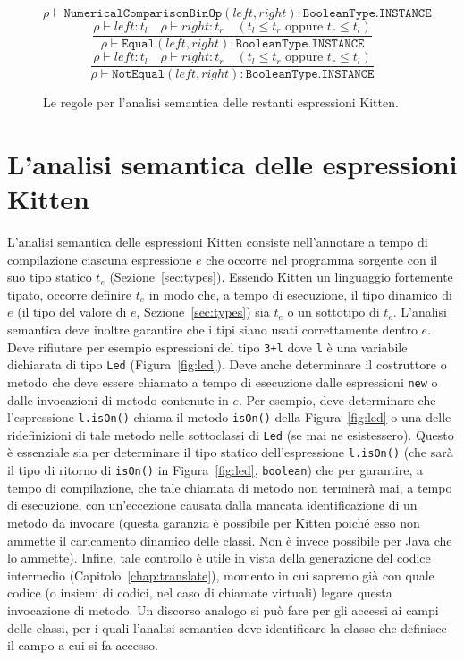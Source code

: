 \begin{figure}[t]
{\[         {\rho\vdash\mathtt{NumericalComparisonBinOp
           (\mathit{left},\mathit{right})}:\mathtt{BooleanType.INSTANCE}}
  \]
  \[
    \frac{\rho\vdash\mathit{left}:t_l\quad
          \rho\vdash\mathit{right}:t_r\quad (t_l\le t_r\text{ oppure }
          t_r\le t_l)}
         {\rho\vdash\mathtt{Equal(\mathit{left},\mathit{right})}:
           \mathtt{BooleanType.INSTANCE}}
  \]
  \[
    \frac{\rho\vdash\mathit{left}:t_l\quad
          \rho\vdash\mathit{right}:t_r\quad (t_l\le t_r\text{ oppure }
          t_r\le t_l)}
         {\rho\vdash\mathtt{NotEqual(\mathit{left},\mathit{right})}:
           \mathtt{BooleanType.INSTANCE}}
  \]
}
\caption{Le regole per l'analisi semantica delle restanti espressioni Kitten.}
  \label{fig:analysis_expressions2}
\end{figure}
%
\section{L'analisi semantica delle espressioni Kitten}
  \label{sec:analysis_expressions}
%
L'analisi semantica delle espressioni Kitten consiste nell'annotare a tempo
di compilazione ciascuna
espressione $e$ che occorre nel programma sorgente con il suo tipo statico
$t_e$ (Sezione~\ref{sec:types}).
Essendo Kitten un linguaggio fortemente tipato, occorre definire
$t_e$ in modo che, a tempo di esecuzione, il tipo dinamico di $e$
(\cioe il tipo del valore di $e$, Sezione~\ref{sec:types})
sia $t_e$ o un sottotipo di $t_e$.
L'analisi semantica deve inoltre garantire che i tipi siano usati correttamente
dentro $e$. Deve rifiutare per esempio espressioni del tipo
\texttt{3+l} dove \texttt{l} \`e una variabile dichiarata di tipo
\texttt{Led} (Figura~\ref{fig:led}). Deve anche determinare il costruttore o 
metodo che deve essere chiamato a tempo di esecuzione dalle espressioni
\texttt{new} o dalle invocazioni di metodo contenute in $e$. Per esempio,
deve determinare che l'espressione \texttt{l.isOn()} chiama il metodo
\texttt{isOn()} della Figura~\ref{fig:led} o una delle ridefinizioni di tale
metodo nelle sottoclassi di \texttt{Led} (se mai ne esistessero). Questo \`e
essenziale sia per determinare il tipo statico dell'espressione
\texttt{l.isOn()} (che sar\`a il tipo di ritorno di \texttt{isOn()} in
Figura~\ref{fig:led}, \cioe \texttt{boolean})
che per garantire, a tempo di compilazione, che tale chiamata di metodo
non terminer\`a mai, a tempo di esecuzione, con un'eccezione causata dalla
mancata identificazione di un metodo da invocare (questa garanzia \`e possibile
per Kitten poich\'e esso non ammette il caricamento dinamico delle classi.
Non \`e invece possibile per Java che lo ammette). Infine, tale
controllo \`e utile in vista della generazione del codice intermedio
(Capitolo~\ref{chap:translate}), momento in cui sapremo gi\`a con quale
codice (o insiemi di codici, nel caso di chiamate virtuali)
legare questa invocazione di metodo.
Un discorso analogo si pu\`o fare per gli accessi ai campi delle classi,
per i quali l'analisi semantica deve identificare la classe che definisce
il campo a cui si fa accesso.

